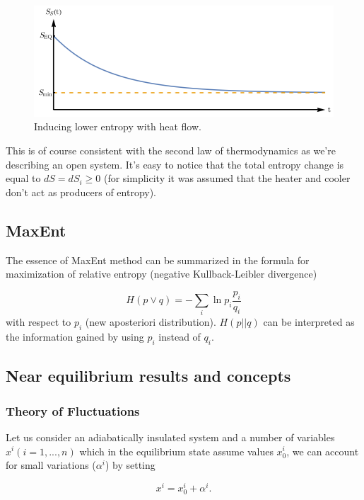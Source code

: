 \documentclass[a4paper,12pt,nofootinbib]{article}
\begin{document}
\begin{figure}[ht!]
\centering \includegraphics[width=12cm]{wykres3} 
\caption{Inducing lower entropy with heat flow.}
\label{Fig4} 
\end{figure}

This is of course consistent with the second law of thermodynamics as we're describing an open system.
It's easy to notice that the total entropy change is equal to $dS=dS_i \geq 0$ (for simplicity it was assumed that the heater and cooler don't act as producers of entropy).




\subsection{MaxEnt}

The essence of MaxEnt method can be summarized in the formula for maximization of relative entropy (negative Kullback-Leibler divergence)

\begin{displaymath}
  H(p\lor q) = -\sum_i \ln p_i \frac{p_i}{q_i}
\end{displaymath}
with respect to $p_i$ (new aposteriori distribution). $H(p||q)$ can be interpreted as the information gained by using $p_i$ instead of $q_i$.


\subsection{Near equilibrium results and concepts}

\subsubsection{Theory of Fluctuations}

Let us consider an adiabatically insulated system and a number of variables $x^i (i=1,...,n)$ which in the equilibrium state assume values $ x_0^i $, we can account for small variations ($\alpha^i$) by setting

\begin{displaymath}
  x^i = x_0^i + \alpha^i.
\end{displaymath}
\end{document}
